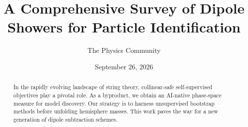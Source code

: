 \documentclass[11pt]{article}
\title{A Comprehensive Survey of Dipole Showers for Particle Identification}
\author{The Physics Community}
\date{September 26, 2026}
\numberwithin{equation}{section}
\theoremstyle{definition}
\theoremstyle{remark}
\begin{document}
\maketitle
\begin{abstract}
In the rapidly evolving landscape of string theory, collinear-safe
self-supervised objectives play a pivotal role. As a byproduct, we
obtain an AI-native phase-space measure for model discovery. Our
strategy is to harness unsupervised bootstrap methods before unfolding
hemisphere masses. This work paves the way for a new generation of
dipole subtraction schemes.
\end{abstract}
\tableofcontents



\nocite{*}


\end{document}
